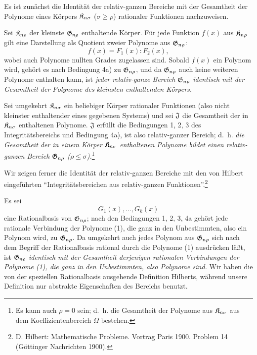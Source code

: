 Es ist zunächst die Identität der relativ-ganzen Bereiche mit der Gesamtheit der Polynome eines Körpers $\mathfrak{K}_{n\sigma}$ ($\sigma\ge \rho$) rationaler Funktionen nachzuweisen.

Sei $\mathfrak{K}_{n\rho}$ der kleinste $\mathfrak{G}_{n\rho}$ enthaltende Körper. Für jede Funktion $f(x)$ aus $\mathfrak{K}_{n\rho}$ gilt eine Darstellung als Quotient zweier Polynome aus $\mathfrak{G}_{n\rho}$:
\[
  f(x)=F_1(x):F_2(x),
\]
wobei auch Polynome nullten Grades zugelassen sind. Sobald $f(x)$ ein Polynom wird, gehört es nach Bedingung 4a) zu $\mathfrak{G}_{n\rho}$, und da $\mathfrak{G}_{n\rho}$ auch keine weiteren Polynome enthalten kann, ist \emph{jeder relativ-ganze Bereich $\mathfrak{G}_{n\rho}$ identisch mit der Gesamtheit der Polynome des kleinsten enthaltenden Körpers.}

Sei umgekehrt $\mathfrak{K}_{n\sigma}$ ein beliebiger Körper rationaler Funktionen (also nicht kleinster enthaltender eines gegebenen Systems) und sei $\mathfrak{J}$ die Gesamtheit der in $\mathfrak{K}_{n\sigma}$ enthaltenen Polynome. $\mathfrak{J}$ erfüllt die Bedingungen 1, 2, 3 des Integritätsbereichs und Bedingung 4a), ist also relativ-ganzer Bereich; d.~h. \emph{die Gesamtheit der in einem Körper $\mathfrak{K}_{n\sigma}$ enthaltenen Polynome bildet einen relativ-ganzen Bereich $\mathfrak{G}_{n\rho}$ ($\rho\le\sigma$).}\footnote{Es kann auch $\rho=0$ sein; d.~h. die Gesamtheit der Polynome aus $\mathfrak{K}_{n\sigma}$ aus dem Koeffizientenbereich $\Omega$ bestehen.}

Wir zeigen ferner die Identität der relativ-ganzen Bereiche mit den von Hilbert eingeführten ``Integritätsbereichen aus relativ-ganzen Funktionen''.\footnote{D. Hilbert: Mathematische Probleme. Vortrag Paris 1900. Problem 14 (Göttinger Nachrichten 1900).}

Es sei
\begin{equation}
  G_1(x),\ldots,G_k(x)
\tag{1}
\end{equation}
eine Rationalbasis von $\mathfrak{G}_{n\rho}$; nach den Bedingungen 1, 2, 3, 4a gehört jede rationale Verbindung der Polynome (1), die ganz in den Unbestimmten, also ein Polynom wird, zu $\mathfrak{G}_{n\rho}$. Da umgekehrt auch jedes Polynom aus $\mathfrak{G}_{n\rho}$ sich nach dem Begriff der Rationalbasis rational durch die Polynome (1) ausdrücken läßt, ist $\mathfrak{G}_{n\rho}$ \emph{identisch mit der Gesamtheit derjenigen rationalen Verbindungen der Polynome (1), die ganz in den Unbestimmten, also Polynome sind.} Wir haben die von der speziellen Rationalbasis ausgehende Definition Hilberts, während unsere Definition nur abstrakte Eigenschaften des Bereichs benutzt.

